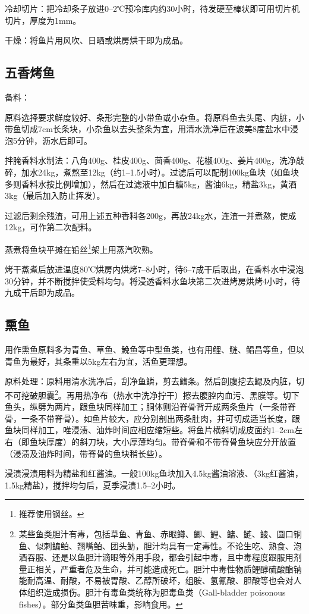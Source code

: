 \documentclass{ctexbook}
\begin{document}
冷却切片：把冷却条子放进0--2℃预冷库内约30小时，待发硬至棒状即可用切片机切片，厚度为1mm。

干燥：将鱼片用风吹、日晒或烘房烘干即为成品。
\subsection{五香烤鱼}
备料：

原料选择要求鲜度较好、条形完整的小带鱼或小杂鱼。将原料鱼去头尾、内脏，小带鱼切成7cm长条块，小杂鱼以去头整条为宜，用清水洗净后在波美8度盐水中浸泡5分钟，沥水后即可。

拌腌香料水制法：八角400g、桂皮400g、茴香400g、花椒400g、姜片400g，洗净敲碎，加水24kg，煮熬至12kg（约1--1.5小时）。过滤后可以配制100kg鱼块（如鱼块多则香料水按比例增加），然后在过滤液中加白糖5kg，酱油6kg，精盐3kg，黄酒3kg（最后加入防止挥发）。

过滤后剩余残渣，可用上述五种香料各200g，再放24kg水，连渣一并煮熬，使成12kg，可作第二次配料。

蒸煮将鱼块平摊在铅丝\footnote{推荐使用钢丝。}架上用蒸汽吹熟。

烤干蒸煮后放进温度80℃烘房内烘烤7--8小时，待6--7成干后取出，在香料水中浸泡30分钟，并不断搅拌使受料均匀。将浸透香料水鱼块第二次进烤房烘烤4小时，待九成干后即为成品。
\subsection{熏鱼}
用作熏鱼原料多为青鱼、草鱼、鮸鱼等中型鱼类，也有用鲤、鲢、鲳昌等鱼，但以青鱼为最好，其条重以5kg左右为宜，活鱼更理想。

原料处理：原料用清水洗净后，刮净鱼鳞，剪去鳍条。然后剖腹挖去鳃及内脏，切不可挖破胆囊\footnote{某些鱼类胆汁有毒，包括草鱼、青鱼、赤眼鳟、鲫、鲤、鳙、鲢、鲮、圆口铜鱼、似刺鳊鲌、翘嘴鲌、团头鲂，胆汁均具有一定毒性。不论生吃、熟食、泡酒吞服、还是以鱼胆汁滴眼等外用手段，都会引起中毒，且中毒程度跟服用剂量正相关，严重者危及生命，并可能造成死亡。胆汁中毒性物质鲤醇硫酸酯钠能耐高温、耐酸，不易被胃酸、乙醇所破坏，组胺、氢氰酸、胆酸等也会对人体组织造成损伤。胆汁有毒鱼类统称为胆毒鱼类（Gall-bladder poisonous fishes）。部分鱼类鱼胆苦味重，影响食用。}。再用热净布（热水中洗净拧干）擦去腹腔内血污、黑膜等。切下鱼头，纵劈为两片，跟鱼块同样加工；胴体则沿脊骨背开成两条鱼片（一条带脊骨，一条不带脊骨）。如鱼片较大，应分别剖出两条肚肉，并可切成适当长度，跟鱼块同样加工，唯浸渍、油炸时间应相应缩短些。将鱼片横斜切成皮面约1--2cm左右（即鱼块厚度）的斜刀块，大小厚薄均匀。带脊骨和不带脊骨鱼块应分开放置（浸渍及油炸时间，带脊骨的鱼块稍长些）。

浸渍浸渍用料为精盐和红酱油。一般100kg鱼块加入4.5kg酱油溶液、（3kg红酱油，1.5kg精盐），搅拌均匀后，夏季浸渍1.5--2小时。
\end{document}
